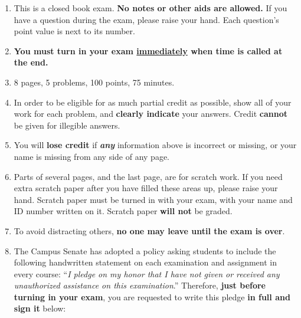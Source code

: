 \documentclass[11pt]{article}
\begin{document}
  \begin{enumerate}

    \addtolength{\itemsep}{-2mm}  %

    \item This is a closed book exam.  {\bf No
          notes %
          or other aids are allowed.}  If you have a question during the
          exam, please raise your hand.  Each question's point value is next
          to its number.

    \item {\bf You must turn in your exam \underline{immediately} when time is
          called at the end.}

    \item 8 pages, 5 problems, 100 points, 75 minutes.

    \item In order to be eligible for as much partial credit as possible,
          show all of your work for each problem, and \textbf{clearly
          indicate} your answers.  Credit \textbf{cannot} be given for
          illegible answers.

    \item You will \textbf{lose credit} if \emph{\textbf{any}} information
          above is incorrect or missing, or your name is missing from any
          side of any page.

    \item Parts of several pages, and the last page, are for scratch work.
          If you need extra scratch paper after you have filled these areas
          up, please raise your hand.  Scratch paper must be turned in with
          your exam, with your name and ID number written on it.  Scratch
          paper \textbf{will not} be graded.

    \item To avoid distracting others, \textbf{no one may leave until the
          exam is over}.


    \item The Campus Senate has adopted a policy asking students to include
          the following handwritten statement on each examination and
          assignment in every course: ``\textit{I pledge on my honor that I
          have not given or received any unauthorized assistance on this
          examination\/}.''  Therefore, \textbf{just before turning in your
          exam}, you are requested to write this pledge \textbf{in full
          \textmd{and} sign it} below:


\end{enumerate}
\end{document}
